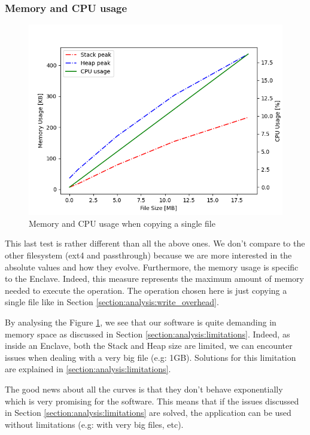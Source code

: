 \documentclass[../main.tex]{subfiles}
\begin{document}
\subsubsection{Memory and CPU usage}
\label{section:analysis:memory_cpu_usage}
\begin{figure}[h]
    \centering
    \includegraphics[width=.8\textwidth]{images/analysis/memory_cpu_usage}
    
    \caption{Memory and CPU usage when copying a single file}
    \label{figure:analysis:memory_cpu_usage}
\end{figure}
\par This last test is rather different than all the above ones. We don't compare to the other filesystem (ext4 and passthrough) because we are more interested in the absolute values and how they evolve. Furthermore, the memory usage is specific to the Enclave. Indeed, this measure represents the maximum amount of memory needed to execute the operation. The operation chosen here is just copying a single file like in Section \ref{section:analysis:write_overhead}.
\par By analysing the Figure \ref{figure:analysis:memory_cpu_usage}, we see that our software is quite demanding in memory space as discussed in Section \ref{section:analysis:limitations}. Indeed, as inside an Enclave, both the Stack and Heap size are limited, we can encounter issues when dealing with a very big file (e.g: 1GB). Solutions for this limitation are explained in \ref{section:analysis:limitations}.
\par The good news about all the curves is that they don't behave exponentially which is very promising for the software. This means that if the issues discussed in Section \ref{section:analysis:limitations} are solved, the application can be used without limitations (e.g: with very big files, etc).
\end{document}
